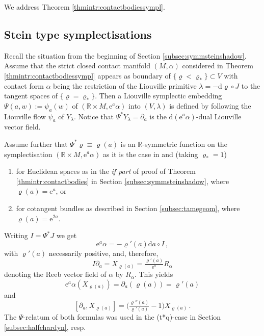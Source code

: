 \documentclass{amsart}
\theoremstyle{definition}
\newcommand{\rmd}{\mathrm d}
\newcommand{\rme}{\mathrm e}
\newcommand{\R}{\mathbb R}
\begin{document}
We address Theorem \ref{thmintr:contactbodiessympl}.




\subsection{Stein type symplectisations}
\label{subsec:steintypesympl}


Recall the situation from the beginning of
Section \ref{subsec:symmsteinshadow}.
Assume
that the strict closed contact manifold $(M,\alpha)$
considered in
Theorem \ref{thmintr:contactbodiessympl}
appears as boundary
of $\{\varrho<\varrho_*\}\subset V$
with contact form $\alpha$ being the restriction
of the Liouville primitive $\lambda=-\rmd\varrho\circ J$
to the tangent spaces of $\{\varrho=\varrho_*\}$.
Then a Liouville symplectic embedding
$\Psi(a,w):=\psi_a(w)$
of $(\R\times M,\rme^a\alpha)$
into $(V,\lambda)$
is defined by following the Liouville flow
$\psi_a$ of $Y_{\lambda}$.
Notice that $\Psi^*Y_{\lambda}=\partial_a$
is the $\rmd(\rme^a\alpha)$-dual Liouville vector field.

Assume further
that $\Psi^*\varrho\equiv\varrho(a)$ is an
$\R$-symmetric function on the symplectisation 
$(\R\times M,\rme^a\alpha)$
as it is the case in \cite[Section 5.5]{kwz22}
and (taking $\varrho_*=1$)
  	\begin{enumerate}
 	\item[(r2n)]
	for Euclidean spaces as in the {\it if part}
	of proof of Theorem \ref{thmintr:contactbodies}
	in Section \ref{subsec:symmsteinshadow},
	where $\varrho(a)=\rme^a$, or
 	\item[(t*q)]
	for cotangent bundles as described in
	Section \ref{subsec:tamegeom},
	where $\varrho(a)=\rme^{2a}$.
	\end{enumerate}
Writing $I=\Psi^*J$ we get
\[
\rme^a\alpha=-\varrho'(a)\rmd a\circ I
\,,
\]
with $\varrho'(a)$ necessarily positive,
and, therefore,
\[
I\partial_a
=X_{\varrho(a)}
=\tfrac{\varrho'(a)}{\rme^a}R_{\alpha}
\]
denoting the Reeb vector field of $\alpha$
by $R_{\alpha}$.
This yields
\[
\rme^a\alpha(X_{\varrho(a)})
=\partial_a(\varrho(a))
=\varrho'(a)
\]
and
\[
[\partial_a,X_{\varrho(a)}]
=\Big(
\tfrac{\varrho''(a)}{\varrho'(a)}-1
\Big)X_{\varrho(a)}
\,.
\]
The $\Psi$-relatum of both formulas
was used in the (t*q)-case
in Section \ref{subsec:halfchardyn}, resp.
\end{document}
